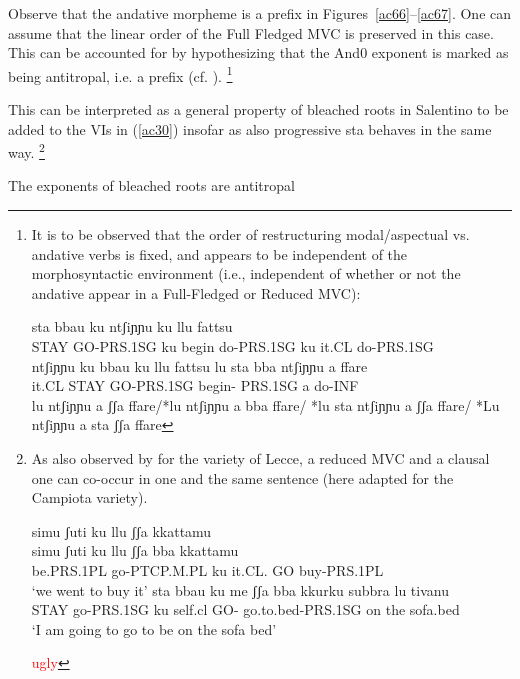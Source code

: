 \documentclass[output=paper]{langscibook}
\begin{document}
Observe that the andative morpheme is a prefix in Figures~\ref{ac66}--\ref{ac67}.  One can assume that the linear order of the Full Fledged MVC is preserved in this case.  This can be accounted for by hypothesizing that the And0 exponent is marked as being antitropal, i.e. a prefix (cf. \cite{bye2012a}).
\footnote{It is to be observed that the order of restructuring modal/aspectual vs. andative verbs is fixed, and appears to be independent of the morphosyntactic environment (i.e., independent of whether or not the andative appear in a Full-Fledged or Reduced MVC):

\ea \label{fn32ex}
    \ea \label{fn32exa}\gll sta bbau   ku ntʃiɲɲu   ku llu  fattsu\\
STAY GO-PRS.1SG ku  begin do-PRS.1SG  ku it.CL do-PRS.1SG\\
\glt *ntʃiɲɲu ku bbau ku llu fattsu
    \ex \label{fn32exb}\gll lu  sta  bba   ntʃiɲɲu      a   ffare\\
it.CL  STAY GO-PRS.1SG begin- PRS.1SG  a   do-INF\\
\glt *lu ntʃiɲɲu a ʃʃa ffare/*lu ntʃiɲɲu a bba ffare/ *lu sta ntʃiɲɲu a ʃʃa ffare/ *Lu  ntʃiɲɲu a sta ʃʃa ffare
    \z
\z

}

This can be interpreted as a general property of bleached roots in Salentino to be added to the VIs in (\ref{ac30}) insofar as also progressive sta behaves in the same way. \footnote{As also observed by \cite{ledgeway2016a} for the variety of Lecce, a reduced MVC and a clausal one can co-occur in one and the same sentence (here adapted for the Campiota variety).

\ea \label{fn33ex}
    \ea \label{fn33exa}\gll simu      ʃuti        ku   llu     ʃʃa {} kkattamu\\
  simu      ʃuti       ku   llu    ʃʃa  bba kkattamu\\
be.PRS.1PL go-PTCP.M.PL  ku   it.CL.    GO  buy-PRS.1PL\\
\glt  ‘we went to buy it’
    \ex \label{fn33exb}\gll sta   bbau     ku  me   ʃʃa bba kkurku      subbra lu tivanu\\
    STAY go-PRS.1SG ku  self.cl  GO- go.to.bed-PRS.1SG on  the sofa.bed\\
    \glt ‘I am going to go to be on the sofa bed’
    \z
\z

\textcolor{red}{ugly}

}

\ea\label{ac68}
The exponents of bleached roots are antitropal
\z
\end{document}
